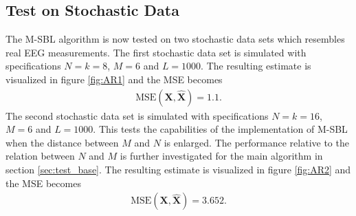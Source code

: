 \subsection{Test on Stochastic Data}\label{sec:testMsbl_stoch}
The M-SBL algorithm is now tested on two stochastic data sets which resembles real EEG measurements. 
The first stochastic data set is simulated with specifications $N = k = 8$, $M = 6$ and $L=1000$. 
The resulting estimate is visualized in figure \ref{fig:AR1} and the MSE becomes 
\begin{align*}
\text{MSE}(\mathbf{X}, \hat{\mathbf{X}}) = 1.1.
\end{align*} 
The second stochastic data set is simulated with specifications $N = k =16$, $M = 6$ and $L=1000$. 
This tests the capabilities of the implementation of M-SBL when the distance between $M$ and $N$ is enlarged. 
The performance relative to the relation between $N$ and $M$ is further investigated for the main algorithm in section \ref{sec:test_base}.
The resulting estimate is visualized in figure \ref{fig:AR2} and the MSE becomes 
\begin{align*}
\text{MSE}(\mathbf{X}, \hat{\mathbf{X}}) = 3.652. 
\end{align*}  
